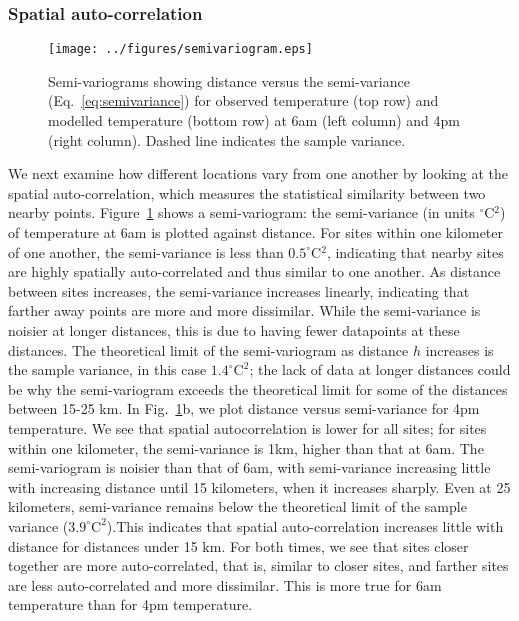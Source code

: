 \documentclass[draft,linenumbers]{agujournal}
\begin{document}
\subsubsection{Spatial auto-correlation}
\begin{figure}
\centering
\texttt{[image: ../figures/semivariogram.eps]}
\caption{Semi-variograms showing distance versus the semi-variance (Eq.~\ref{eq:semivariance}) for observed temperature (top row) and modelled temperature (bottom row) at 6am (left column) and 4pm (right column). Dashed line indicates the sample variance. 
}\label{fig:semiv_obs}
\end{figure}
We next examine how different locations vary from one another by looking at the spatial auto-correlation, which measures the statistical similarity between two nearby points. Figure~\ref{fig:semiv_obs} shows a semi-variogram: the semi-variance (in units $^\circ$C$^2$) of temperature at 6am is plotted against distance. For sites within one kilometer of one another, the semi-variance is less than $0.5^\circ$C$^2$, indicating that nearby sites are highly spatially auto-correlated and thus similar to one another. 
As distance between sites increases, the semi-variance increases linearly, indicating that farther away points are more and more dissimilar. While the semi-variance is noisier at longer distances, this is due to having fewer datapoints at these distances. 
The theoretical limit of the semi-variogram as distance $h$ increases is the sample variance, in this case $1.4^{\circ} \text{C} ^2$; the lack of data at longer distances could be why the semi-variogram exceeds the theoretical limit for some of the distances between 15-25 km. 
In Fig.~\ref{fig:semiv_obs}b, we plot distance versus semi-variance for 4pm temperature. We see that spatial autocorrelation is lower for all sites; for sites within one kilometer, the semi-variance is 1km, higher than that at 6am. The semi-variogram is noisier than that of 6am, with semi-variance increasing little with increasing distance until 15 kilometers, when it increases sharply. Even at 25 kilometers, semi-variance remains below the theoretical limit of the sample variance ($3.9^\circ \text{C}^2$).This indicates that spatial auto-correlation increases little with distance for distances under 15 km.
For both times, we see that sites closer together are more auto-correlated, that is, similar to closer sites, and farther sites are less auto-correlated and more dissimilar. This is more true for 6am temperature than for 4pm temperature. 
\end{document}
